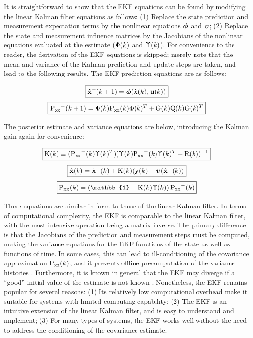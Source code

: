 It is straightforward to show that the EKF equations can be found by modifying the linear Kalman filter equations as follows: (1) Replace the state prediction and measurement expectation terms by the nonlinear equations $\f$ and $\h$; (2) Replace the state and measurement influence matrices by the Jacobians of the nonlinear equations evaluated at the estimate ($\F(k)$ and $\H(k)$).
For convenience to the reader, the derivation of the EKF equations is skipped; merely note that the mean and variance of the Kalman prediction and update steps are taken, and lead to the following results.
The EKF prediction equations are as follows:

\begin{equation}
\boxed{\vecin{\hat{x}^-}{k+1} = \f(\vecin{\hat{x}}{k},\vecin{u}{k})}
\end{equation}
\begin{equation}\boxed{
\P^-(k+1) = \F(k) \P(k) \F(k)^T+ \G(k) \ten{Q}(k) \G(k)^T
}
\end{equation}

The posterior estimate and variance equations are below, introducing the Kalman gain again for convenience:

\begin{equation}
\boxed{
\ten{K}(k) \equiv (\P^-(k) \H(k)^T)(\H(k) \P^-(k) \H(k)^T + \ten{R}(k))^{-1}
}
\end{equation}
\begin{equation}
\boxed{
\vecin{\hat{x}}{k} = \vecin{\hat{x}^-}{k} + \ten{K}(k)(\vecin{\tilde{y}}{k}-\h(\vecin{\hat{x}^-}{k})
}
\end{equation}
\begin{equation}
\boxed{
\P(k) = \left( \ten{\mathbb{1}} - \ten{K}(k)\H(k) \right)\P^-(k)
}
\end{equation}

These equations are similar in form to those of the linear Kalman filter.
In terms of computational complexity, the EKF is comparable to the linear Kalman filter, with the most intensive operation being a matrix inverse.
The primary difference is that the Jacobians of the prediction and measurement steps must be computed, making the variance equations for the EKF functions of the state as well as functions of time.
In some cases, this can lead to ill-conditioning of the covariance approximation $\P(k)$, and it prevents offline precomputation of the variance histories \cite{kay1993}.
Furthermore, it is known in general that the EKF may diverge if a ``good'' initial value of the estimate is not known \cite{wan2000}.
Nonetheless, the EKF remains popular for several reasons: (1) Its relatively low computational overhead make it suitable for systems with limited computing capability; (2) The EKF is an intuitive extension of the linear Kalman filter, and is easy to understand and implement; (3) For many types of systems, the EKF works well without the need to address the conditioning of the covariance estimate.

